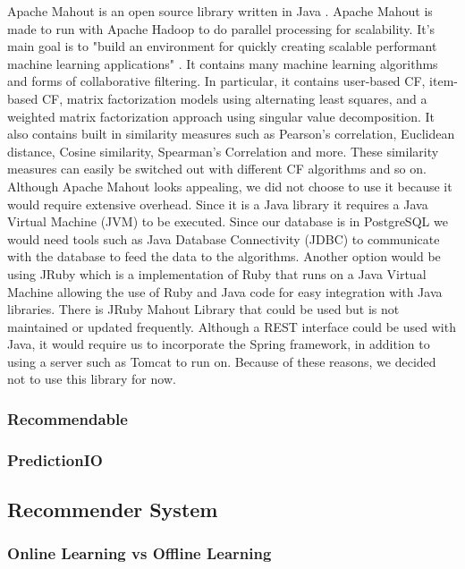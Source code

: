 Apache Mahout is an open source library written in Java \cite{mahout, mahoutaction}. Apache Mahout is made to run with Apache Hadoop to do parallel processing for scalability. It's main goal is to "build an environment for quickly creating scalable performant machine learning applications" \cite{mahout}. It contains many machine learning algorithms and forms of collaborative filtering. In particular, it contains user-based CF, item-based CF, matrix factorization models using alternating least squares, and a weighted matrix factorization approach using singular value decomposition. It also contains built in similarity measures such as Pearson's correlation, Euclidean distance, Cosine similarity, Spearman's Correlation and more. These similarity measures can easily be switched out with different CF algorithms and so on. 
Although Apache Mahout looks appealing, we did not choose to use it because it would require extensive overhead. Since it is a Java library it requires a Java Virtual Machine (JVM) to be executed. Since our database is in PostgreSQL we would need tools such as Java Database Connectivity (JDBC) to communicate with the database to feed the data to the algorithms. Another option would be using JRuby which is a implementation of Ruby that runs on a Java Virtual Machine allowing the use of Ruby and Java code for easy integration with Java libraries.
There is JRuby Mahout Library that could be used but is not maintained or updated frequently. Although a REST interface could be used with Java, it would require us to incorporate the Spring framework, in addition to using a server such as Tomcat to run on. Because of these reasons, we decided not to use this library for now.

\subsubsection{Recommendable}
\subsubsection{PredictionIO}

\subsection{Recommender System}
\subsubsection{Online Learning vs Offline Learning}

